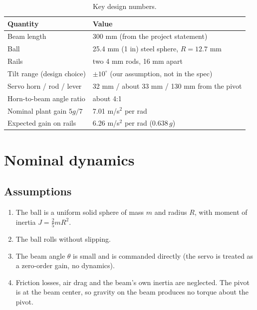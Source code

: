 \documentclass[11pt]{article}
\begin{document}
\begin{table}[htbp]
\caption{\label{tab:keynumbers}Key design numbers.}
\centering
\begin{tabularx}{0.9\textwidth}{lY}
Quantity & Value\\
\hline
Beam length & 300 mm (from the project statement)\\
Ball & 25.4 mm (1 in) steel sphere, \(R = 12.7\) mm\\
Rails & two 4 mm rods, 16 mm apart\\
Tilt range (design choice) & \(\pm 10^\circ\) (our assumption, not in the spec)\\
Servo horn / rod / lever & 32 mm / about 33 mm / 130 mm from the pivot\\
Horn-to-beam angle ratio & about 4:1\\
Nominal plant gain \(5g/7\) & 7.01 m/s\(^2\) per rad\\
Expected gain on rails & 6.26 m/s\(^2\) per rad (\(0.638\,g\))\\
\end{tabularx}
\end{table}
\section{Nominal dynamics}
\label{sec:org2ed31d0}
\subsection{Assumptions}
\label{sec:org54de8a0}
\begin{enumerate}
\item The ball is a uniform solid sphere of mass \(m\) and radius \(R\), with moment of inertia \(J = \tfrac{2}{5} m R^2\).
\item The ball rolls without slipping.
\item The beam angle \(\theta\) is small and is commanded directly (the servo is treated as a zero-order gain, no dynamics).
\item Friction losses, air drag and the beam's own inertia are neglected. The pivot is at the beam center, so gravity on the beam produces no torque about the pivot.
\end{enumerate}
\end{document}
